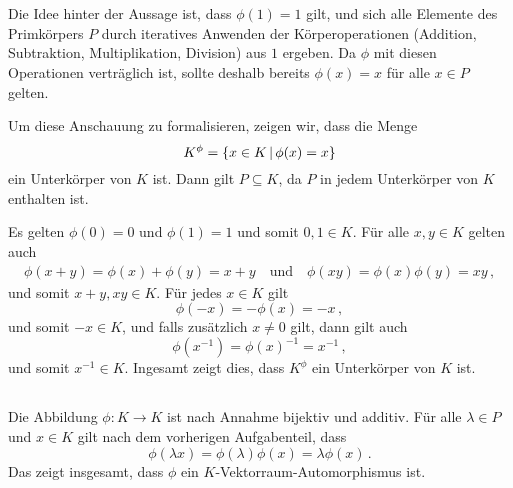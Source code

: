\section{}





\subsection{}

Die Idee hinter der Aussage ist, dass $\phi(1) = 1$ gilt, und sich alle Elemente des Primkörpers $P$ durch iteratives Anwenden der Körperoperationen (Addition, Subtraktion, Multiplikation, Division) aus $1$ ergeben.
Da $\phi$ mit diesen Operationen verträglich ist, sollte deshalb bereits $\phi(x) = x$ für alle $x \in P$ gelten.

Um diese Anschauung zu formalisieren, zeigen wir, dass die Menge
\[
    K^\phi
  = \{ x \in K \suchthat \phi(x) = x \}
\]
ein Unterkörper von $K$ ist.
Dann gilt $P \subseteq K$, da $P$ in jedem Unterkörper von $K$ enthalten ist.

Es gelten $\phi(0) = 0$ und $\phi(1) = 1$ und somit $0, 1 \in K$.
Für alle $x, y \in K$ gelten auch
\begin{gather*}
    \phi(x+y)
  = \phi(x) + \phi(y)
  = x + y
  \quad\text{und}\quad
    \phi(xy)
  = \phi(x) \phi(y)
  = xy \,,
\end{gather*}
und somit $x + y, xy \in K$.
Für jedes $x \in K$ gilt
\[
    \phi(-x)
  = -\phi(x)
  = -x \,,
\]
und somit $-x \in K$, und falls zusätzlich $x \neq 0$ gilt, dann gilt auch
\[
    \phi(x^{-1})
  = \phi(x)^{-1}
  = x^{-1} \,,
\]
und somit $x^{-1} \in K$.
Ingesamt zeigt dies, dass $K^\phi$ ein Unterkörper von $K$ ist.





\subsection{}

Die Abbildung $\phi \colon K \to K$ ist nach Annahme bijektiv und additiv.
Für alle $\lambda \in P$ und $x \in K$ gilt nach dem vorherigen Aufgabenteil, dass
\[
    \phi(\lambda x)
  = \phi(\lambda) \phi(x)
  = \lambda \phi(x) \,.
\]
Das zeigt insgesamt, dass $\phi$ ein $K$-Vektorraum-Automorphismus ist.
